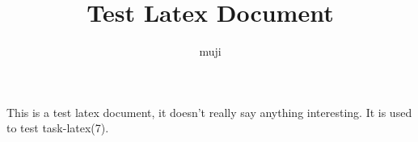 \documentclass[a4paper,oneside,twocolumns]{article}
\title{Test Latex Document}
\author{muji}
\renewcommand{\paragraph}{\large}
\begin{document}
\fancyhead{}
\fancyfoot{}

\lfoot{\thepage}

\clearpage

%
%

\paragraph{\normalsize{This is a test latex document, it doesn't really say anything interesting. It is used to test task-latex(7).}}
\end{document}
